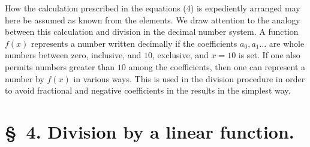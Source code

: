 \documentclass[11pt]{article}
\begin{document}
How the calculation prescribed in the equations (4) is expediently arranged may here be assumed as known from the elements. We draw attention to the analogy between this calculation and division in the decimal number system. A function $f(x)$ represents a number written decimally if the coefficients $a_0,a_1\ldots$ are whole numbers between zero, inclusive, and $10$, exclusive, and $x=10$ is set. If one also permits numbers greater than $10$ among the coefficients, then one can represent a number by $f(x)$ in various ways. This is used in the division procedure in order to avoid fractional and negative coefficients in the results in the simplest way.

\section*{\S~4. Division by a linear function.}
\end{document}
